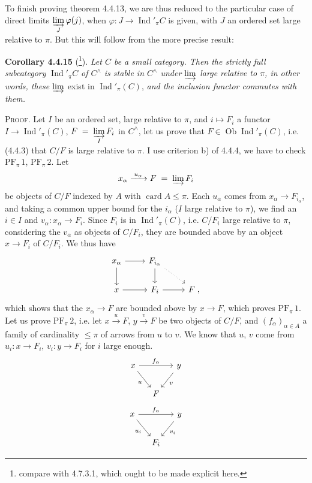 \documentclass[11pt]{article}
\newcommand{\printedpage}[1]{\marginpar{\footnotesize p.~#1}}
\newcommand{\msp}[1]{\marginpar{\footnotesize [#1]}}
\newcommand{\Ind}{\operatorname{Ind}}
\newcommand{\Ob}{\operatorname{Ob}}
\newcommand{\card}{\operatorname{card}}
\newcommand{\PF}{\mathrm{PF}}
\begin{document}
To finish proving theorem 4.4.13, we are thus reduced to the particular case of direct limits $\varinjlim\limits_{J}\varphi(j)$, when $\varphi:J\longrightarrow\Ind'_\pi C$ is given, with $J$ an
\printedpage{25}
\msp{page 99}
ordered set large relative to $\pi$. But this will follow from the more precise result:

\textbf{Corollary 4.4.15} (\footnote{compare with 4.7.3.1, which ought to be made explicit here.}). \textit{Let $C$ be a small category. Then the strictly full subcategory} $\Ind'_\pi C$ \textit{of $C^\wedge$ is stable in $C^\wedge$ under $\varinjlim$ large relative to $\pi$, in other words, these $\varinjlim$} exist in $\Ind'_\pi(C)$, \textit{and the inclusion functor commutes with them.} %

\textsc{Proof}. Let $I$ be an ordered set, large relative to $\pi$, and $i\longmapsto F_i$ a functor $I\longrightarrow\Ind'_\pi(C)$, $F\;=\;\varinjlim\limits_{I}F_i$ in $C^\wedge$, let us prove that $F\in\Ob\Ind'_\pi(C)$, i.e. (4.4.3) that $C/F$ is large relative to $\pi$. I use criterion b) of 4.4.4, we have to check $\PF_\pi\,1$, $\PF_\pi\,2$. Let
\[
x_\alpha\xrightarrow{\;u_\alpha\;}F\;=\;\varinjlim F_i
\]
be objects of $C/F$ indexed by $A$ with $\card A\leqslant\pi$. Each $u_\alpha$ comes from $x_\alpha\longrightarrow F_{i_\alpha}$, and taking a common upper bound for the $i_\alpha$ ($I$ large relative to $\pi$), we find an $i\in I$ and $v_\alpha:x_\alpha\longrightarrow F_i$. Since $F_i$ is in $\Ind'_\pi(C)$, i.e. $C/F_i$ large relative to $\pi$, considering the $v_\alpha$ as objects of $C/F_i$, they are bounded above by an object $x\longrightarrow F_i$ of $C/F_i$. We thus have
\[
\begin{tikzcd}
x_\alpha \arrow[r] \arrow[d] & F_{i_\alpha} \arrow[d] \arrow[dr, dotted] & \\
x \arrow[r] & F_i \arrow[r] & F\;,
\end{tikzcd}
\]
which shows that the $x_\alpha\longrightarrow F$ are bounded above by $x\longrightarrow F$,
\msp{page 100}
which proves $\PF_\pi\,1$. Let us prove $\PF_\pi\,2$, i.e. let $x\xrightarrow{\;u\;}F$, $y\xrightarrow{\;v\;}F$ be two objects of $C/F$, and $(f_\alpha)_{\alpha\in A}$ a family of cardinality $\leqslant\pi$ of arrows from $u$ to $v$. We know that $u$, $v$ come from $u_i:x\longrightarrow F_i$, $v_i:y\longrightarrow F_i$ for $i$ large enough.
\[
\begin{tikzcd}[column sep=small]
x \arrow[rr, "f_\alpha"] \arrow[dr, "u"'] & & y \arrow[dl, "v"] \\
& F &
\end{tikzcd}
\]
\[
\begin{tikzcd}[column sep=small]
x \arrow[rr, "f_\alpha"] \arrow[dr, "u_i"'] & & y \arrow[dl, "v_i"] \\
& F_i &
\end{tikzcd}
\]
\end{document}
